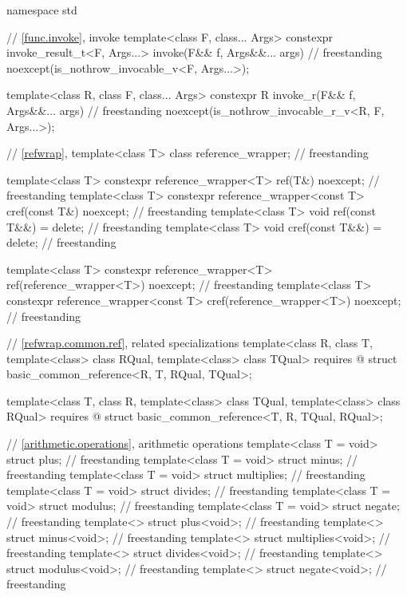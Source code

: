 %
%
%
\begin{codeblock}
namespace std {
  // \ref{func.invoke}, invoke
  template<class F, class... Args>
    constexpr invoke_result_t<F, Args...> invoke(F&& f, Args&&... args)             // freestanding
      noexcept(is_nothrow_invocable_v<F, Args...>);

  template<class R, class F, class... Args>
    constexpr R invoke_r(F&& f, Args&&... args)                                     // freestanding
      noexcept(is_nothrow_invocable_r_v<R, F, Args...>);

  // \ref{refwrap}, 
  template<class T> class reference_wrapper;                                        // freestanding

  template<class T> constexpr reference_wrapper<T> ref(T&) noexcept;                // freestanding
  template<class T> constexpr reference_wrapper<const T> cref(const T&) noexcept;   // freestanding
  template<class T> void ref(const T&&) = delete;                                   // freestanding
  template<class T> void cref(const T&&) = delete;                                  // freestanding

  template<class T>
    constexpr reference_wrapper<T> ref(reference_wrapper<T>) noexcept;              // freestanding
  template<class T>
    constexpr reference_wrapper<const T> cref(reference_wrapper<T>) noexcept;       // freestanding

  // \ref{refwrap.common.ref},  related specializations
  template<class R, class T, template<class> class RQual, template<class> class TQual>
    requires @\seebelow@
  struct basic_common_reference<R, T, RQual, TQual>;

  template<class T, class R, template<class> class TQual, template<class> class RQual>
    requires @\seebelow@
  struct basic_common_reference<T, R, TQual, RQual>;

  // \ref{arithmetic.operations}, arithmetic operations
  template<class T = void> struct plus;                                             // freestanding
  template<class T = void> struct minus;                                            // freestanding
  template<class T = void> struct multiplies;                                       // freestanding
  template<class T = void> struct divides;                                          // freestanding
  template<class T = void> struct modulus;                                          // freestanding
  template<class T = void> struct negate;                                           // freestanding
  template<> struct plus<void>;                                                     // freestanding
  template<> struct minus<void>;                                                    // freestanding
  template<> struct multiplies<void>;                                               // freestanding
  template<> struct divides<void>;                                                  // freestanding
  template<> struct modulus<void>;                                                  // freestanding
  template<> struct negate<void>;                                                   // freestanding

}
\end{codeblock}
